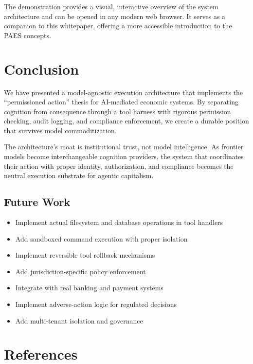 \documentclass[11pt,a4paper]{article}
\begin{document}
The demonstration provides a visual, interactive overview of the system architecture and can be opened in any modern web browser. It serves as a companion to this whitepaper, offering a more accessible introduction to the PAES concepts.

\section{Conclusion}

We have presented a model-agnostic execution architecture that implements the ``permissioned action'' thesis for AI-mediated economic systems. By separating cognition from consequence through a tool harness with rigorous permission checking, audit logging, and compliance enforcement, we create a durable position that survives model commoditization.

The architecture's moat is institutional trust, not model intelligence. As frontier models become interchangeable cognition providers, the system that coordinates their action with proper identity, authorization, and compliance becomes the neutral execution substrate for agentic capitalism.

\subsection{Future Work}

\begin{itemize}
    \item Implement actual filesystem and database operations in tool handlers
    \item Add sandboxed command execution with proper isolation
    \item Implement reversible tool rollback mechanisms
    \item Add jurisdiction-specific policy enforcement
    \item Integrate with real banking and payment systems
    \item Implement adverse-action logic for regulated decisions
    \item Add multi-tenant isolation and governance
\end{itemize}

\section{References}
\end{document}
